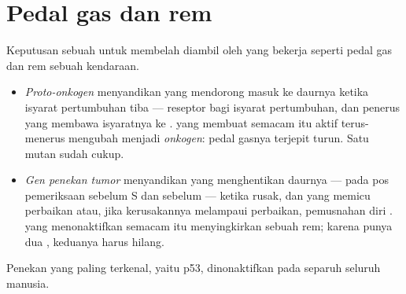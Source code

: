 \section{Pedal gas dan rem}

\begin{proposition}\label{prop:g11:cancer:genes}
Keputusan sebuah  untuk membelah diambil oleh  yang bekerja
seperti pedal gas dan rem sebuah kendaraan.
\begin{itemize}
  \item \emph{Proto-onkogen} menyandikan 
        yang mendorong  masuk ke daurnya ketika isyarat
        pertumbuhan tiba --- reseptor bagi isyarat pertumbuhan, dan
        penerus yang membawa isyaratnya ke .  yang
        membuat  semacam itu aktif terus-menerus mengubah 
        menjadi \emph{onkogen}: pedal gasnya terjepit turun. Satu 
        mutan sudah cukup.
  \item \emph{Gen penekan tumor} menyandikan
         yang menghentikan daurnya --- pada pos pemeriksaan
        sebelum S dan sebelum  --- ketika  rusak, dan
        yang memicu perbaikan atau, jika kerusakannya melampaui
        perbaikan, pemusnahan diri .  yang menonaktifkan
         semacam itu menyingkirkan sebuah rem; karena 
        punya dua , keduanya harus hilang.
\end{itemize}
Penekan yang paling terkenal, yaitu  p53, dinonaktifkan pada
separuh seluruh  manusia.
\end{proposition}
\admitted


